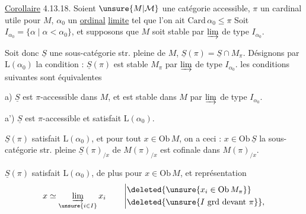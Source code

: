 
\uline{Corollaire} 4.13.18.  Soient $\unsure{M|\mathcal M}$ une catégorie accessible, $\pi$ un cardinal utile pour $M$, $\alpha_0$ un \uline{ordinal} \uline{limite} tel que l'on ait $\mathrm{Card}\,\alpha_0\leq\pi$ \unsure{;} Soit $I_{\alpha_0}=\{\alpha\mid\alpha<\alpha_0\}$, et supposons que $M$ soit stable par $\varinjlim$ de type $I_{\alpha_0}$.


Soit donc $\underline S$ une sous-catégorie str. pleine de $M$, $\underline S(\pi)=\underline S\cap M_\pi$. Désignons par $\mathrm L(\alpha_0)$ la condition : $\underline S(\pi)$ est stable   $M_\pi$ par $\varinjlim$ de type $I_{\alpha_0}$.   les conditions suivantes sont équivalentes

a) $\underline S$ est $\pi$-accessible dans $M$, et  est stable dans $M$ par $\varinjlim$ de type $I_{\alpha_0}$.

a') $\underline S$ est $\pi$-accessible et  satisfait $\mathrm L(\alpha_0)$.

 $\underline S(\pi)$ satisfait $\mathrm L(\alpha_0)$, et pour tout $x\in\mathrm{Ob}\,M$,  on a ceci : $x\in\mathrm{Ob}\,\underline S$  la sous-catégorie str. pleine $\underline S(\pi)_{/x}$  de $M(\pi)_{/x}$ est cofinale dans $M(\pi)_{/x}$.

 $\underline S(\pi)$ satisfait $\mathrm L(\alpha_0)$, de plus pour  $x\in\mathrm{Ob}\,M$, et  représentation
\[
 x\simeq\varinjlim_{\unsure{i\in I}}x_i\qquad
 \left|\begin{aligned}
 &\deleted{\unsure{x_i\in\mathrm{Ob}\,M_\pi}}\\
 &\deleted{\unsure{I\text{ grd devant }\pi}},\end{aligned}\right.
\]


